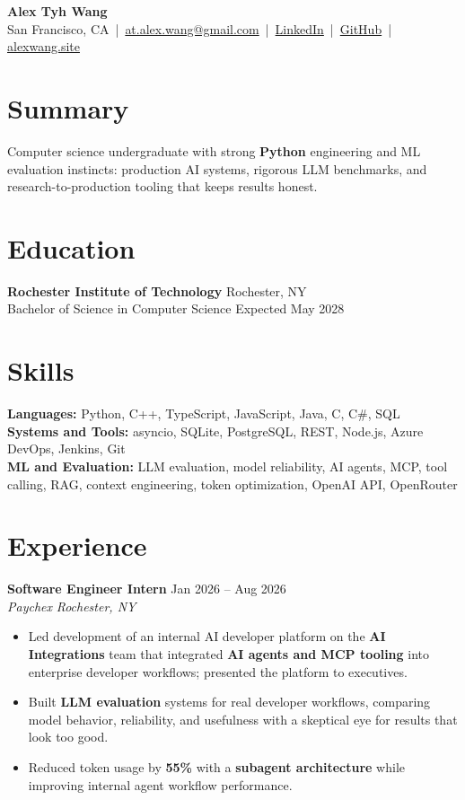 \documentclass[10pt,letterpaper]{article}
\newif\ifresumeFirstRole
\newcommand{\resumeRole}[4]{%
  \ifresumeFirstRole
    \global\resumeFirstRolefalse
  \else
    \vspace{0pt plus 1fill}%
  \fi
  \textbf{#1} \hfill #2\\
  \textit{#3} \hfill \textit{#4}
}
\begin{document}
\begin{center}
{\Large \textbf{Alex Tyh Wang}}\\
San Francisco, CA \,|\, \href{mailto:at.alex.wang@gmail.com}{at.alex.wang@gmail.com} \,|\, \href{https://www.linkedin.com/in/alex-tyh-wang/}{LinkedIn} \,|\, \href{https://github.com/alextyhwang}{GitHub} \,|\, \href{https://alexwang.site}{alexwang.site}
\end{center}

\section*{Summary}
Computer science undergraduate with strong \textbf{Python} engineering and ML evaluation instincts: production AI systems, rigorous LLM benchmarks, and research-to-production tooling that keeps results honest.

\section*{Education}
\textbf{Rochester Institute of Technology} \hfill Rochester, NY\\
Bachelor of Science in Computer Science \hfill Expected May 2028

\section*{Skills}
\textbf{Languages:} Python, C++, TypeScript, JavaScript, Java, C, C\#, SQL\\
\textbf{Systems and Tools:} asyncio, SQLite, PostgreSQL, REST, Node.js, Azure DevOps, Jenkins, Git\\
\textbf{ML and Evaluation:} LLM evaluation, model reliability, AI agents, MCP, tool calling, RAG, context engineering, token optimization, OpenAI API, OpenRouter

\section*{Experience}
\resumeRole{Software Engineer Intern}{Jan 2026 -- Aug 2026}{Paychex}{Rochester, NY}
\begin{itemize}
  \item Led development of an internal AI developer platform on the \textbf{AI Integrations} team that integrated \textbf{AI agents and MCP tooling} into enterprise developer workflows; presented the platform to executives.
  \item Built \textbf{LLM evaluation} systems for real developer workflows, comparing model behavior, reliability, and usefulness with a skeptical eye for results that look too good.
  \item Reduced token usage by \textbf{55\%} with a \textbf{subagent architecture} while improving internal agent workflow performance.
\end{itemize}
\end{document}
